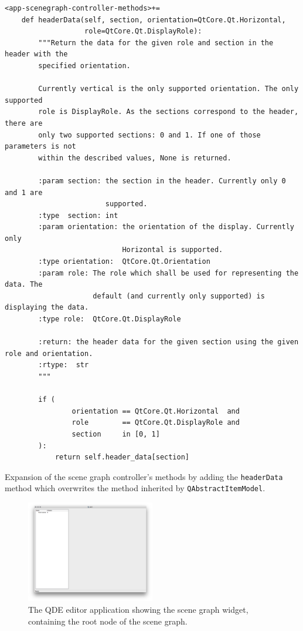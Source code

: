 \documentclass[10pt, openright, notitlepage]{scrreprt}
\begin{document}
\begin{listing}[H]
\begin{verbatim}
<app-scenegraph-controller-methods>+=
    def headerData(self, section, orientation=QtCore.Qt.Horizontal,
                   role=QtCore.Qt.DisplayRole):
        """Return the data for the given role and section in the header with the
        specified orientation.
    
        Currently vertical is the only supported orientation. The only supported
        role is DisplayRole. As the sections correspond to the header, there are
        only two supported sections: 0 and 1. If one of those parameters is not
        within the described values, None is returned.
    
        :param section: the section in the header. Currently only 0 and 1 are
                        supported.
        :type  section: int
        :param orientation: the orientation of the display. Currently only
                            Horizontal is supported.
        :type orientation:  QtCore.Qt.Orientation
        :param role: The role which shall be used for representing the data. The
                     default (and currently only supported) is displaying the data.
        :type role:  QtCore.Qt.DisplayRole
    
        :return: the header data for the given section using the given role and orientation.
        :rtype:  str
        """
    
        if (
                orientation == QtCore.Qt.Horizontal  and
                role        == QtCore.Qt.DisplayRole and
                section     in [0, 1]
        ):
            return self.header_data[section]
\end{verbatim}
\caption{\label{lst:app-scenegraph-controller-methods-header-data}
Expansion of the scene graph controller's methods by adding the \texttt{headerData} method which overwrites the method inherited by \texttt{QAbstractItemModel}.}
\end{listing}

\begin{figure}[H]
\centering
\includegraphics[width=0.5\textwidth]{./images/qde_alpha_03.png}
\caption{\label{fig:editor-alpha-03}
The QDE editor application showing the scene graph widget, containing the root node of the scene graph.}
\end{figure}
\end{document}
